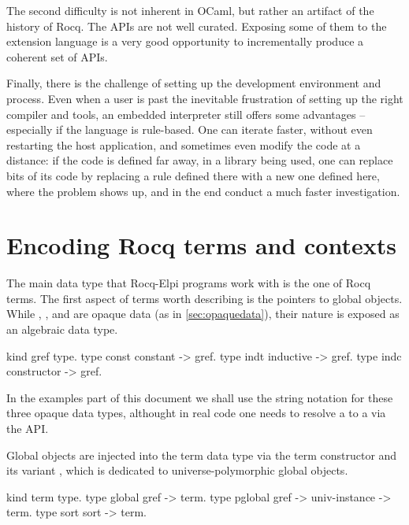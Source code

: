 \documentclass{these-ISSS}
\newenvironment{elpicode}
  {\VerbatimEnvironment\begin{elpibox}\begin{xelpicode}}{\end{xelpicode}
\end{elpibox}}
\begin{document}
The second difficulty is not inherent in OCaml, but rather an artifact of the
history of Rocq. The APIs are not well curated. Exposing some of them to the
extension language is a very good opportunity to incrementally produce a
coherent set of APIs.

Finally, there is the challenge of setting up the development environment and
process. Even when a user is past the inevitable frustration of setting up the
right compiler and tools, an embedded interpreter still offers some
advantages -- especially if the language is rule-based. One can iterate faster,
without even restarting the host application, and sometimes even modify the
code at a distance: if the code is defined far away, in a library being used,
one can replace bits of its code by replacing a rule defined there with a
new one defined here, where the problem shows up, and in the end conduct a
much faster investigation.

\section{Encoding Rocq terms and contexts}\label{GALLINA}


The main data type that Rocq-Elpi programs work with is the one of Rocq terms. The
first aspect of terms worth describing is the pointers to global objects.
While , , and  are opaque
data (as in \cref{sec:opaquedata}), their nature is exposed as an algebraic
data type.

\begin{elpicode}
kind gref type.
type const constant -> gref.            %
type indt  inductive -> gref.           %
type indc  constructor -> gref.         %
\end{elpicode}

\noindent
In the examples part of this document we shall use the string notation for
these three opaque data types, althought in real code one needs to resolve
a  to a  via the  API.

Global objects are injected into the term data type via the  term
constructor and its variant , which is dedicated to
universe-polymorphic global objects.

\begin{elpicode}
kind term type.
type global  gref -> term.
type pglobal gref -> univ-instance -> term.
type sort    sort -> term.                 %
\end{elpicode}
\end{document}
